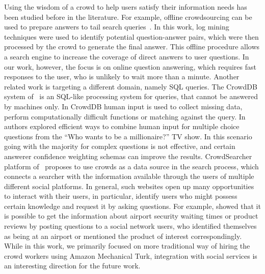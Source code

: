 \documentclass[letterpaper]{article}
\begin{document}
Using the wisdom of a crowd to help users satisfy their information needs has been studied before in the literature.
For example, offline crowdsourcing can be used to prepare answers to tail search queries~\cite{bernstein2012direct}.
In this work, log mining techniques were used to identify potential question-answer pairs, which were then processed by the crowd to generate the final answer.
This offline procedure allows a search engine to increase the coverage of direct answers to user questions.
In our work, however, the focus is on online question answering, which requires fast responses to the user, who is unlikely to wait more than a minute.
Another related work is targeting a different domain, namely SQL queries.
The CrowdDB system of~\cite{franklin2011crowddb} is an SQL-like processing system for queries, that cannot be answered by machines only.
In CrowdDB human input is used to collect missing data, perform computationally difficult functions or matching against the query.
In~\cite{aydin2014crowdsourcing} authors explored efficient ways to combine human input for multiple choice questions from the ``Who wants to be a millionaire?'' TV show.
In this scenario going with the majority for complex questions is not effective, and certain answerer confidence weighting schemas can improve the results.  
CrowdSearcher platform of~\cite{Bozzon:2012:ASQ:2187836.2187971} proposes to use crowds as a data source in the search process, which connects a searcher with the information available through the users of multiple different social platforms.
In general, such websites open up many opportunities to interact with their users, in particular, identify users who might possess certain knowledge and request it by asking questions.
For example, \cite{nichols2012asking,nichols2013analyzing,mahmud2013recommending} showed that it is possible to get the information about airport security waiting times or product reviews by posting questions to a social network users, who identified themselves as being at an airport or mentioned the product of interest correspondingly.
While in this work, we primarily focused on more traditional way of hiring the crowd workers using Amazon Mechanical Turk, integration with social services is an interesting direction for the future work.
\end{document}
